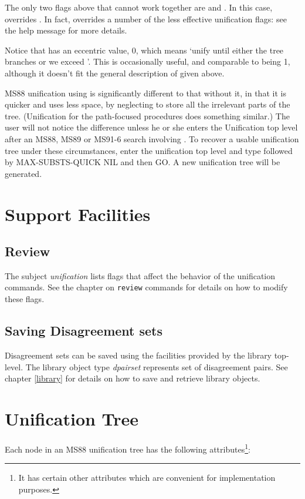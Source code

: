 The only two flags above that cannot work together are  and .
In this case,  overrides . In fact,
 overrides a number of the less effective unification flags: see the help message for
more details.

Notice that  has an eccentric value, 0, which means `unify until either the tree
branches or we exceed '. This is occasionally useful, and comparable to
 being 1, although it doesn't fit the general description of 
given above.

MS88 unification using  is significantly different to that without it, in
that it is quicker and uses less space, by neglecting to store all the irrelevant parts of the tree. (Unification
for the path-focused procedures does something similar.) The user
will not notice the difference unless he or she enters the Unification top level after an MS88, MS89 or MS91-6
search involving . To recover a usable unification tree under these circumstances,
enter the unification top level and type  followed by MAX-SUBSTS-QUICK NIL and then
GO. A new unification tree will be generated.

\section{Support Facilities}

\subsection{Review}
The subject {\it unification} lists flags that affect the behavior of the
unification commands. See the chapter on {\tt review} commands for details on how
to modify these flags.

\subsection{Saving Disagreement sets}
Disagreement sets can be saved using the facilities provided by the
library top-level. The library object type {\it dpairset} represents set of
disagreement pairs. See chapter \ref{library} for details on how to
save and retrieve library objects.

\section{Unification Tree}
Each node in an MS88 unification tree has the following attributes\footnote{It has
certain other attributes which are convenient for implementation purposes.}:

